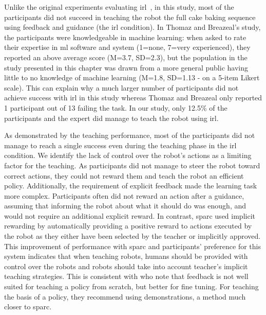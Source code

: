 
Unlike the original experiments evaluating \gls{irl}~\citep{thomaz2008teachable}, in this study, most of the participants did not succeed in teaching the robot the full cake baking sequence using feedback and guidance (the \gls{irl} condition). In Thomaz and Breazeal's study, the participants were knowledgeable in machine learning: when asked to rate their expertise in \gls{ml} software and system (1=none, 7=very experienced), they reported an above average score (M=3.7, SD=2.3), but the population in the study presented in this chapter was drawn from a more general public having little to no knowledge of machine learning (M=1.8, SD=1.13 - on a 5-item Likert scale). This can explain why a much larger number of participants did not achieve success with \gls{irl} in this study whereas Thomaz and Breazeal only reported 1 participant out of 13 failing the task. In our study, only 12.5\% of the participants and the expert did manage to teach the robot using \gls{irl}. 

As demonstrated by the teaching performance, most of the participants did not manage to reach a single success even during the teaching phase in the \gls{irl} condition. We identify the lack of control over the robot's actions as a limiting factor for the teaching. As participants did not manage to steer the robot toward correct actions, they could not reward them and teach the robot an efficient policy. Additionally, the requirement of explicit feedback made the learning task more complex. Participants often did not reward an action after a guidance, assuming that informing the robot about what it should do was enough, and would not require an additional explicit reward. In contrast, \gls{sparc} used implicit rewarding by automatically providing a positive reward to actions executed by the robot as they either have been selected by the teacher or implicitly approved. This improvement of performance with \gls{sparc} and participants' preference for this system indicates that when teaching robots, humans should be provided with control over the robots and robots should take into account teacher's implicit teaching strategies. This is consistent with \cite{kaochar2011towards} who note that feedback is not well suited for teaching a policy from scratch, but better for fine tuning. For teaching the basis of a policy, they recommend using demonstrations, a method much closer to \gls{sparc}. 

